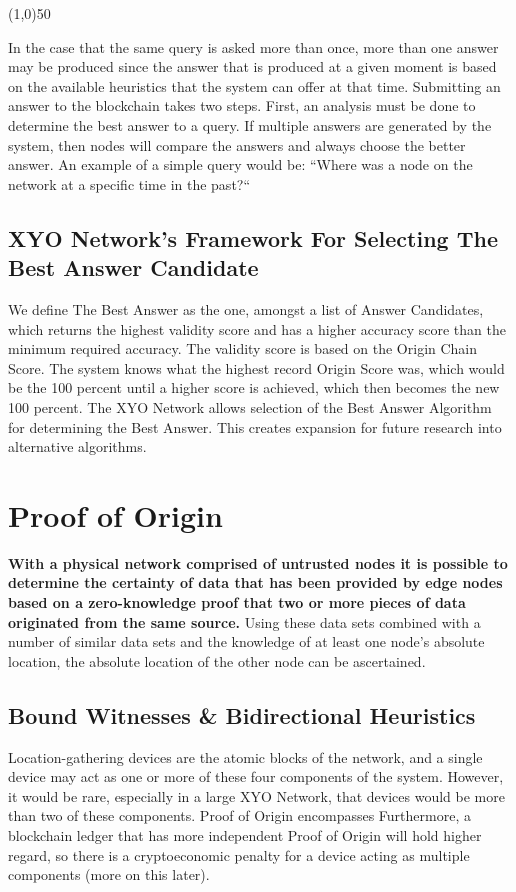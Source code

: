 \documentclass{article}
\begin{document}
\begin{center}
\line(1,0){50}
\end{center}

In the case that the same query is asked more than once, more than one answer may be produced since the answer that is produced at a given moment is based on the available heuristics that the system can offer at that time.
Submitting an answer to the blockchain takes two steps. First, an analysis must be done to determine the best answer to a query. If multiple answers are generated by the system, then nodes will compare the answers and always choose the better answer. An example of a simple query would be: ``Where was a node on the network at a specific time in the past?``

\subsection{XYO Network’s Framework For Selecting The Best Answer Candidate}
We define The Best Answer as the one, amongst a list of Answer Candidates, which returns the highest validity score and has a higher accuracy score than the minimum required accuracy. The validity score is based on the Origin Chain Score. The system knows what the highest record Origin Score was, which would be the 100 percent until a higher score is achieved, which then becomes the new 100 percent. The XYO Network allows selection of the Best Answer Algorithm for determining the Best Answer. This creates expansion for future research into alternative algorithms.

\section{Proof of Origin}
\textbf{With a physical network comprised of untrusted nodes it is possible to determine
the certainty of data that has been provided by edge nodes based on a zero-knowledge
proof that two or more pieces of data originated from the same source.} Using these
data sets combined with a number of similar data sets and the knowledge of at least one
node’s absolute location, the absolute location of the other node can be ascertained.

\subsection{Bound Witnesses \& Bidirectional Heuristics}
Location-gathering devices are the atomic blocks of the network, and a single device may act as one or more of these four components of the system. However, it would be rare, especially in a large XYO Network, that devices would be more than two of these components. Proof of Origin encompasses Furthermore, a blockchain ledger that has more independent Proof of Origin will hold higher regard, so there is a cryptoeconomic penalty for a device acting as multiple components (more on this later).
\end{document}
